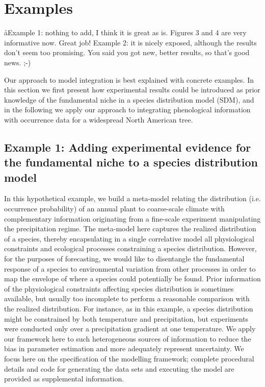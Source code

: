 \section*{Examples}
\aa{Example 1: nothing to add, I think it is great as is. Figures 3 and 4 are very informative now. Great job! 
Example 2: it is nicely exposed, although the results don't seem too promising. You said you got new, better results, so that’s good news. ;-)}

Our approach to model integration is best explained with concrete examples. 
In this section we first present how experimental results could be introduced as prior knowledge of the fundamental niche in a species distribution model (\ac{SDM}), and in the following we apply our approach to integrating phenological information with occurrence data for a widespread North American tree.

\subsection*{Example 1: Adding experimental evidence for the fundamental niche to a species distribution model} 

In this hypothetical example, we build a meta-model relating the distribution (i.e. occurrence probability) of an annual plant to coarse-scale climate with complementary information originating from a fine-scale experiment manipulating the precipitation regime.
The meta-model here captures the realized distribution of a species, thereby encapsulating in a single correlative model all physiological constraints and ecological processes constraining a species distribution. 
However, for the purposes of forecasting, we would like to disentangle the fundamental response of a species to environmental variation from other processes in order to map the envelope of where a species could potentially be found. 
Prior information of the physiological constraints affecting species distribution is sometimes available, but usually too incomplete to perform a reasonable comparison with the realized distribution.
For instance, as in this example, a species distribution might be constrained by both temperature and precipitation, but experiments were conducted only over a precipitation gradient at one temperature. 
We apply our framework here to such heterogeneous sources of information to reduce the bias in parameter estimation and more adequately represent uncertainty. 
We focus here on the specification of the modelling framework; complete procedural details and code for generating the data sets and executing the model are provided as supplemental information.


